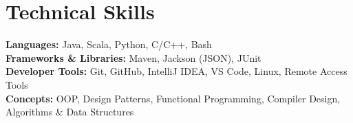 \documentclass[letterpaper,11pt]{article}
\begin{document}
\section{Technical Skills}
 \begin{itemize}[leftmargin=0.15in, label={}]
    \small{\item{
     \textbf{Languages:}{ Java, Scala, Python, C/C++, Bash} \\
     \textbf{Frameworks \& Libraries:}{ Maven, Jackson (JSON), JUnit} \\
     \textbf{Developer Tools:}{ Git, GitHub, IntelliJ IDEA, VS Code, Linux, Remote Access Tools} \\
     \textbf{Concepts:}{ OOP, Design Patterns, Functional Programming, Compiler Design, Algorithms \& Data Structures}
    }}
 \end{itemize}


\end{document}
